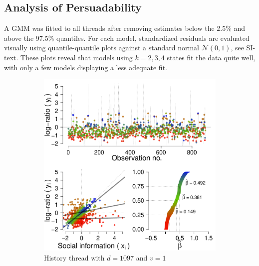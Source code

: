 \documentclass[9pt,a4paper,twocolumn,lineno]{article}
\begin{document}
\subsection*{Analysis of Persuadability} 
A GMM was fitted to all threads after removing estimates below the 2.5\% and above the 97.5\% quantiles. For each model, standardized residuals are evaluated visually using quantile-quantile plots against a standard normal $\mathcal{N}(0,1)$, see SI-text. These plots reveal that models using $k=2,3,4$ states fit the data quite well, with only a few models displaying a less adequate fit.

\begin{figure}[!h]
	\centering
	\begin{subfigure}{.44\linewidth}
		\centering
		\includegraphics[width=1\linewidth]{h10971.pdf}
		\caption{\footnotesize History thread with $d=1097$ and $v=1$}
		\label{fig: h=history d=1097, v=1}
	\end{subfigure}
	\begin{subfigure}{.44\linewidth}
		\centering

\end{subfigure}
\end{figure}
\end{document}
